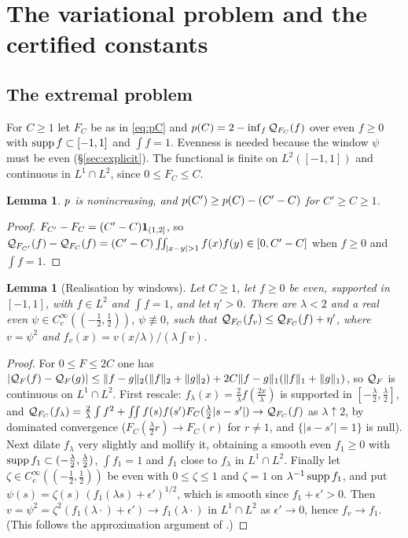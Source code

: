 \documentclass[11pt]{amsart}
\newtheorem{lemma}[theorem]{Lemma}
\theoremstyle{definition}
\theoremstyle{remark}
\numberwithin{equation}{section}
\begin{document}
\section{The variational problem and the certified constants}\label{sec:variational}

\subsection{The extremal problem}
For $C\ge1$ let $F_C$ be as in \eqref{eq:pC} and $p(C)=2-\inf_f\mathcal Q_{F_C}(f)$ over even $f\ge0$ with $\operatorname{supp} f\subset[-1,1]$ and $\int f=1$. Evenness is needed because the window $\psi$ must be even (\S\ref{sec:explicit}). The functional is finite on $L^2([-1,1])$ and continuous in $L^1\cap L^2$, since $0\le F_C\le C$.

\begin{lemma}\label{lem:pLip}
$p$ is nonincreasing, and $p(C')\ge p(C)-(C'-C)$ for $C'\ge C\ge1$.
\end{lemma}
\begin{proof}
$F_{C'}-F_C=(C'-C)\mathbf 1_{(1,2]}$, so $\Qf_{F_{C'}}(f)-\Qf_{F_C}(f)=(C'-C)\iint_{|x-y|>1}f(x)f(y)\in[0,C'-C]$ when $f\ge0$ and $\int f=1$.
\end{proof}

\begin{lemma}[Realisation by windows]\label{lem:windows}
Let $C\ge1$, let $f\ge0$ be even, supported in $[-1,1]$, with $f\in L^2$ and $\int f=1$, and let $\eta'>0$. There are $\lambda<2$ and a real even $\psi\in C_c^\infty((-\frac12,\frac12))$, $\psi\not\equiv0$, such that $\mathcal Q_{F_C}(f_v)\le\mathcal Q_{F_C}(f)+\eta'$, where $v=\psi^2$ and $f_v(x)=v(x/\lambda)/(\lambda\int v)$.
\end{lemma}
\begin{proof}
For $0\le F\le 2C$ one has $|\mathcal Q_F(f)-\mathcal Q_F(g)|\le\|f-g\|_2(\|f\|_2+\|g\|_2)+2C\|f-g\|_1(\|f\|_1+\|g\|_1)$, so $\mathcal Q_F$ is continuous on $L^1\cap L^2$. First rescale: $f_\lambda(x)=\frac2\lambda f(\frac{2x}\lambda)$ is supported in $[-\frac\lambda2,\frac\lambda2]$, and $\mathcal Q_{F_C}(f_\lambda)=\frac2\lambda\int f^2+\iint f(s)f(s')F_C(\frac\lambda2|s-s'|)\to\mathcal Q_{F_C}(f)$ as $\lambda\uparrow2$, by dominated convergence ($F_C(\frac\lambda2r)\to F_C(r)$ for $r\ne1$, and $\{|s-s'|=1\}$ is null). Next dilate $f_\lambda$ very slightly and mollify it, obtaining a smooth even $f_1\ge0$ with $\operatorname{supp} f_1\subset(-\frac\lambda2,\frac\lambda2)$, $\int f_1=1$ and $f_1$ close to $f_\lambda$ in $L^1\cap L^2$. Finally let $\zeta\in C_c^\infty((-\frac12,\frac12))$ be even with $0\le\zeta\le1$ and $\zeta=1$ on $\lambda^{-1}\operatorname{supp} f_1$, and put $\psi(s)=\zeta(s)\,(f_1(\lambda s)+\epsilon')^{1/2}$, which is smooth since $f_1+\epsilon'>0$. Then $v=\psi^2=\zeta^2(f_1(\lambda\cdot)+\epsilon')\to f_1(\lambda\cdot)$ in $L^1\cap L^2$ as $\epsilon'\to0$, hence $f_v\to f_1$. (This follows the approximation argument of \cite[\S11]{HY26}.)
\end{proof}
\end{document}
